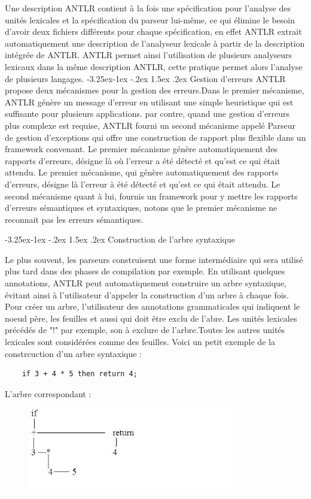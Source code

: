 \documentclass{article}
\makeatletter
\newcounter {subsubsubsection}[subsubsection]
\newcommand\subsubsubsection{\@startsection{subsubsubsection}{4}{\z@}%
                                     {-3.25ex\@plus -1ex \@minus -.2ex}%
                                     {1.5ex \@plus .2ex}%
                                     {\normalfont\normalsize\bfseries}}
\makeatother
\begin{document}
Une description ANTLR contient à la fois une spécification pour l'analyse des unités lexicales et la spécification du parseur lui-même, ce qui élimine le besoin d'avoir deux fichiers différents pour chaque spécification, en effet ANTLR extrait automatiquement une description de l'analyseur lexicale à partir de la description intégrée de ANTLR.
ANTLR permet ainsi l'utilisation de plusieurs analyseurs lexicaux dans la même description ANTLR, cette pratique permet alors l'analyse de plusieurs langages.
\subsubsubsection{Gestion d'erreurs}
ANTLR propose deux mécanismes pour la gestion des erreurs.Dans le premier mécanisme, ANTLR génère un message d'erreur en utilisant une simple heuristique qui est suffisante pour plusieurs applications. par contre, quand une gestion d'erreurs plus complexe est requise, ANTLR fourni un second mécanisme appelé Parseur de gestion d'exceptions qui offre une construction de rapport plus flexible dans un framework convenant.
Le premier mécanisme génère automatiquement des rapports d'erreurs, désigne là où l'erreur a été détecté et qu'est ce qui était attendu.
Le premier mécanisme, qui génère automatiquement des rapports d'erreurs, désigne là l'erreur à été détecté et qu'est ce qui était attendu.
Le second mécanisme quant à lui, fournis un framework pour y mettre les rapports d'erreurs sémantiques et syntaxiques, notons que le premier mécanisme ne reconnait pas les erreurs sémantiques.

\subsubsubsection{Construction de l'arbre syntaxique}

Le plus souvent, les parseurs construisent une forme intermédiaire qui sera utilisé plus tard dans des phases de compilation par exemple. En utilisant quelques annotations, ANTLR peut automatiquement construire un arbre syntaxique, évitant ainsi à l'utilisateur d'appeler la construction d'un arbre à chaque fois.
Pour créer un arbre, l'utilisateur des annotations grammaticales qui indiquent le noeud père, les feuilles et aussi qui doit être exclu de l'abre. Les unités lexicales précédés de "!" par exemple, son à exclure de l'arbre.Toutes les autres unités lexicales sont considérées comme des feuilles.
Voici un petit exemple de la constrcuction d'un arbre syntaxique : 
\begin{verbatim}
	if 3 + 4 * 5 then return 4;
\end{verbatim}

L'arbre correspondant :

\begin{figure}[h]
	\centering
		\includegraphics[width=0.80\textwidth]{ast.jpg}
	\label{fig:ast_process}
\end{figure}
\end{document}
